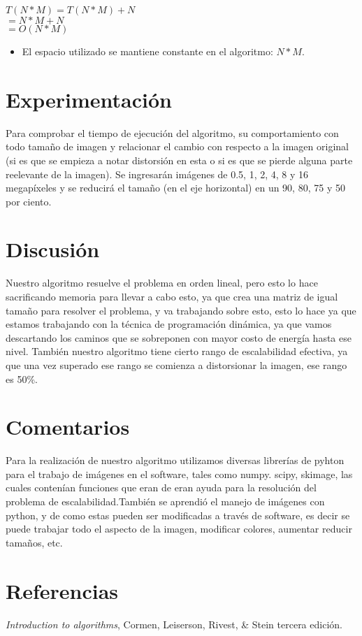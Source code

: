 \documentclass[twocolumn,11pts]{IEEEtran}
\begin{document}
$T(N*M)= T(N*M)+N$ \\
$      = N*M+N$\\
$      = O(N*M)$\\

\begin{itemize}
\item El espacio utilizado se mantiene constante en el algoritmo: $N*M$.
\end{itemize} 

\section{Experimentación}
Para comprobar el tiempo de ejecución del algoritmo, su comportamiento con todo tamaño de imagen y relacionar el cambio con respecto a la imagen original (si es que se empieza a notar distorsión en esta o si es que se pierde alguna parte reelevante de la imagen). Se ingresarán imágenes de 0.5, 1, 2, 4, 8 y 16 megapíxeles y se reducirá el tamaño (en el eje horizontal) en un 90, 80, 75 y 50 por ciento.

\section{Discusión}
Nuestro algoritmo resuelve el problema en orden lineal, pero esto lo hace sacrificando memoria para llevar a cabo esto, ya que crea una matriz de igual tamaño para resolver el problema, y va trabajando sobre esto, esto lo hace ya que estamos trabajando con la técnica de programación dinámica, ya que vamos descartando los caminos que se sobreponen con mayor costo de energía hasta ese nivel. También nuestro algoritmo tiene cierto rango de escalabilidad efectiva, ya que una vez superado ese rango se comienza a distorsionar la imagen, ese rango es 50\%.
\section{Comentarios}
Para la realización de nuestro algoritmo utilizamos diversas librerías de pyhton para el trabajo de imágenes en el software, tales como numpy. scipy, skimage, las cuales contenían funciones que eran de eran ayuda para la resolución del problema de escalabilidad.También se aprendió el manejo de imágenes con python, y de como estas pueden ser modificadas a través de software, es decir se puede trabajar todo el aspecto de la imagen, modificar colores, aumentar reducir tamaños, etc.
\section{Referencias}
\textit {Introduction to algorithms}, Cormen, Leiserson, Rivest, \& Stein tercera edición.

%
%


\end{document}
